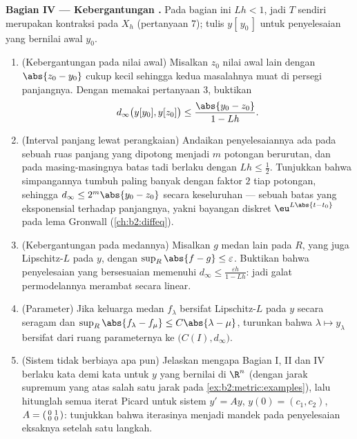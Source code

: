\begin{problem}
\medskip
\noindent\textbf{Bagian IV --- Kebergantungan .} Pada bagian
ini $Lh < 1$, jadi $T$ sendiri merupakan kontraksi pada $X_h$ (pertanyaan
7); tulis $y[\,y_0\,]$ untuk penyelesaian yang bernilai awal
$y_0$.
\begin{enumerate}[resume]
  \item (Kebergantungan pada nilai awal) Misalkan $z_0$ nilai awal
        lain dengan $\abs{z_0 - y_0}$ cukup kecil sehingga
        kedua masalahnya muat di persegi panjangnya. Dengan memakai
        pertanyaan 3, buktikan
        \[
        d_\infty\bigl(y[y_0], y[z_0]\bigr) \leq
        \frac{\abs{y_0 - z_0}}{1 - Lh}.
        \]
  \item (Interval panjang lewat perangkaian) Andaikan penyelesaiannya
        ada pada sebuah ruas panjang yang dipotong menjadi $m$ potongan
        berurutan, dan pada masing-masingnya batas tadi berlaku dengan
        $Lh \leq \frac12$. Tunjukkan bahwa simpangannya tumbuh paling
        banyak dengan faktor $2$ tiap potongan, sehingga $d_\infty \leq
        2^m\abs{y_0 - z_0}$ secara keseluruhan --- sebuah batas yang
        eksponensial terhadap panjangnya, yakni bayangan diskret
        $\eu^{L\abs{t - t_0}}$ pada lema Gronwall
        (\cref{ch:b2:diffeq}).
  \item (Kebergantungan pada medannya) Misalkan $g$ medan lain pada
        $R$, yang juga Lipschitz-$L$ pada $y$, dengan $\sup_R \abs{f - g}
        \leq \varepsilon$. Buktikan bahwa penyelesaian yang
        bersesuaian memenuhi $d_\infty \leq
        \frac{\varepsilon h}{1 - Lh}$: jadi galat permodelannya
        merambat secara linear.
  \item (Parameter) Jika keluarga medan $f_\lambda$ bersifat
        Lipschitz-$L$ pada $y$ secara seragam dan $\sup_R\abs{f_\lambda
        - f_\mu} \leq C\abs{\lambda - \mu}$, turunkan bahwa
        $\lambda \mapsto y_\lambda$ bersifat  dari ruang
        parameternya ke $\bigl(C(I), d_\infty\bigr)$.
  \item (Sistem tidak berbiaya apa pun) Jelaskan mengapa Bagian I, II
        dan IV berlaku kata demi kata untuk $y$ yang bernilai di $\R^n$
        (dengan jarak supremum yang  atas salah satu jarak pada
        \cref{ex:b2:metric:examples}), lalu hitunglah semua iterat
        Picard untuk sistem $y' = Ay$, $y(0) = (c_1,
        c_2)$, $A = \begin{psmallmatrix} 0 & 1\\ 0 &
        0\end{psmallmatrix}$: tunjukkan bahwa iterasinya menjadi
        mandek pada penyelesaian eksaknya setelah satu langkah.
\end{enumerate}


\end{problem}

